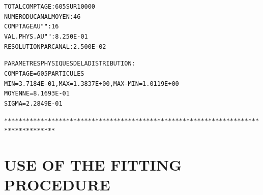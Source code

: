 \begin{alltt}
                TOTAL  COMPTAGE                 :     605  SUR  10000
                NUMERO   DU  CANAL  MOYEN       :      46
                COMPTAGE  AU   "      "         :      16
                VAL. PHYS. AU  "      "         :  8.250E-01      
                RESOLUTION  PAR  CANAL          :  2.500E-02      

                PARAMETRES  PHYSIQUES  DE  LA  DISTRIBUTION :
                         COMPTAGE =    605  PARTICULES
                         MIN =  3.7184E-01, MAX =  1.3837E+00, MAX-MIN =  1.0119E+00      
                         MOYENNE =  8.1693E-01      
                         SIGMA =  2.2849E-01      

************************************************************************************
\end{alltt}
\onecolumn

\normalsize

 \clearpage








\section{USE OF THE FITTING PROCEDURE}
        
